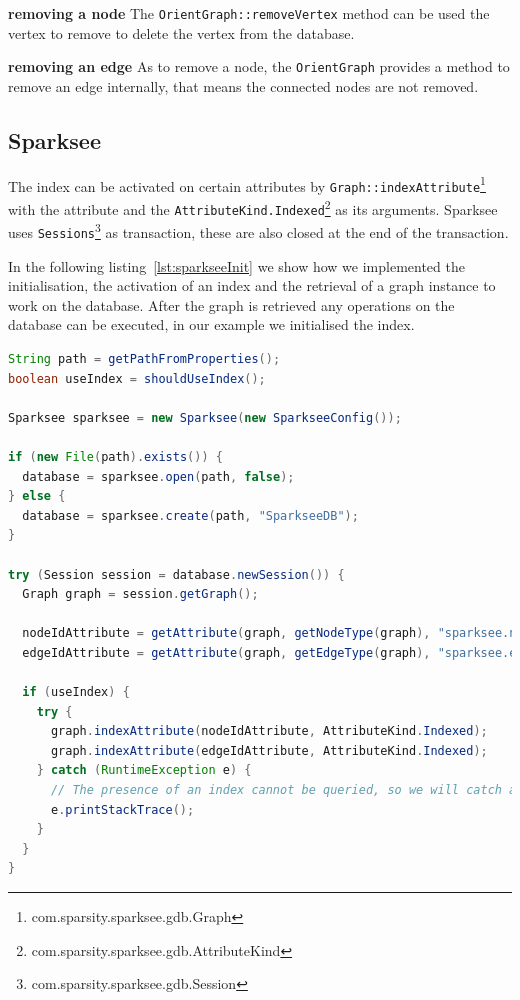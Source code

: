 \textbf{removing a node} \newline
The \texttt{OrientGraph::removeVertex} method can be used the vertex to remove to delete the vertex from the database.

\textbf{removing an edge} \newline
As to remove a node,
the \texttt{OrientGraph} provides a method to remove an edge internally,
that means the connected nodes are not removed.

\subsection{Sparksee}
The index can be activated on certain attributes by \texttt{Graph::indexAttribute}\footnote{com.sparsity.sparksee.gdb.Graph} with the attribute and the \texttt{AttributeKind.Indexed}\footnote{com.sparsity.sparksee.gdb.AttributeKind} as its arguments.
Sparksee uses \texttt{Sessions}\footnote{com.sparsity.sparksee.gdb.Session} as transaction,
these are also closed at the end of the transaction.

In the following listing~\ref{lst:sparkseeInit} we show how we implemented the initialisation, the activation of an index and the retrieval of a graph instance to work on the database.
After the graph is retrieved any operations on the database can be executed,
in our example we initialised the index.

\begin{lstlisting}[language=Java,label={lst:sparkseeInit},caption={Implementation of the initialisation and starting of a session.}]
String path = getPathFromProperties();
boolean useIndex = shouldUseIndex();

Sparksee sparksee = new Sparksee(new SparkseeConfig());

if (new File(path).exists()) {
  database = sparksee.open(path, false);
} else {
  database = sparksee.create(path, "SparkseeDB");
}

try (Session session = database.newSession()) {
  Graph graph = session.getGraph();

  nodeIdAttribute = getAttribute(graph, getNodeType(graph), "sparksee.nodeId");
  edgeIdAttribute = getAttribute(graph, getEdgeType(graph), "sparksee.edgeId");

  if (useIndex) {
    try {
      graph.indexAttribute(nodeIdAttribute, AttributeKind.Indexed);
      graph.indexAttribute(edgeIdAttribute, AttributeKind.Indexed);
    } catch (RuntimeException e) {
      // The presence of an index cannot be queried, so we will catch and ignore the exception thrown when an index already exists.
      e.printStackTrace();
    }
  }
}
\end{lstlisting}

